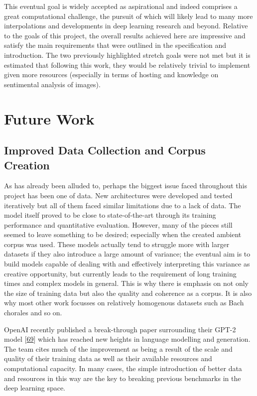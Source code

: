 \documentclass[12pt,]{article}
\begin{document}
This eventual goal is widely accepted as aspirational and indeed
comprises a great computational challenge, the pursuit of which will
likely lead to many more interpolations and developments in deep
learning research and beyond. Relative to the goals of this project, the
overall results achieved here are impressive and satisfy the main
requirements that were outlined in the specification and introduction.
The two previously highlighted stretch goals were not met but it is
estimated that following this work, they would be relatively trivial to
implement given more resources (especially in terms of hosting and
knowledge on sentimental analysis of images).

\hypertarget{future-work}{%
\section{Future Work}\label{future-work}}

\hypertarget{improved-data-collection-and-corpus-creation}{%
\subsection{Improved Data Collection and Corpus
Creation}\label{improved-data-collection-and-corpus-creation}}

As has already been alluded to, perhaps the biggest issue faced
throughout this project has been one of data. New architectures were
developed and tested iteratively but all of them faced similar
limitations due to a lack of data. The model itself proved to be close
to state-of-the-art through its training performance and quantitative
evaluation. However, many of the pieces still seemed to leave something
to be desired; especially when the created ambient corpus was used.
These models actually tend to struggle more with larger datasets if they
also introduce a large amount of variance; the eventual aim is to build
models capable of dealing with and effectively interpreting this
variance as creative opportunity, but currently leads to the requirement
of long training times and complex models in general. This is why there
is emphasis on not only the size of training data but also the quality
and coherence as a corpus. It is also why most other work focusses on
relatively homogenous datasets such as Bach chorales and so on.

OpenAI recently published a break-through paper surrounding their GPT-2
model {[}\protect\hyperlink{ref-radford2018language}{69}{]} which has
reached new heights in language modelling and generation. The team cites
much of the improvement as being a result of the scale and quality of
their training data as well as their available resources and
computational capacity. In many cases, the simple introduction of better
data and resources in this way are the key to breaking previous
benchmarks in the deep learning space.
\end{document}
